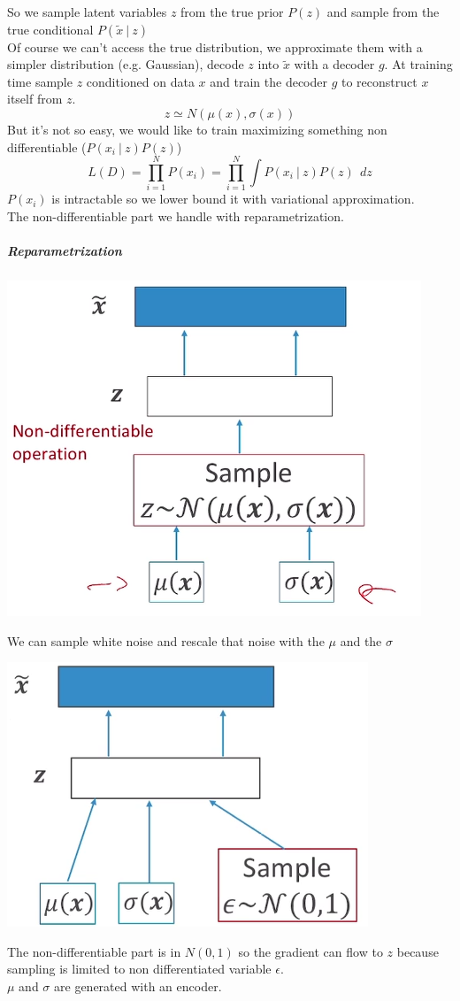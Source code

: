 \documentclass[10pt]{report}
\begin{document}
So we sample latent variables $z$ from the true prior $P(z)$ and sample from the true conditional $P(\tilde{x}\:|\:z)$\\
Of course we can't access the true distribution, we approximate them with a simpler distribution (e.g. Gaussian), decode $z$ into $\tilde{x}$ with a decoder $g$. At training time sample $z$ conditioned on data $x$ and train the decoder $g$ to reconstruct $x$ itself from $z$.
$$z\simeq N(\mu(x),\sigma(x))$$
But it's not so easy, we would like to train maximizing something non differentiable ($P(x_i\:|\:z)P(z)$)
$$L(D)=\prod_{i=1}^NP(x_i)=\prod_{i=1}^N\int P(x_i\:|\:z)P(z)\:\:dz$$
$P(x_i)$ is intractable so we lower bound it with variational approximation.\\
The non-differentiable part we handle with reparametrization.
\subparagraph{Reparametrization} \begin{center}
	\includegraphics[scale=0.5]{142.png}
\end{center}
We can sample white noise and rescale that noise with the $\mu$ and the $\sigma$
\begin{center}
	\includegraphics[scale=0.5]{143.png}
\end{center}
The non-differentiable part is in $N(0,1)$ so the gradient can flow to $z$ because sampling is limited to non differentiated variable $\epsilon$.\\
$\mu$ and $\sigma$ are generated with an encoder.
\end{document}
